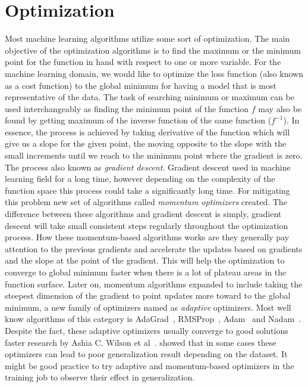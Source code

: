 \section{Optimization} \label{sec:optimization}
Most machine learning algorithms utilize some sort of optimization. 
The main objective of the optimization algorithms is to find the maximum or the minimum point for the function in hand with respect to one or more variable. 
For the machine learning domain, we would like to optimize the loss function (also known as a cost function) to the global minimum for having a model that is most representative of the data.
The task of searching minimum or maximum can be used interchangeably as finding the minimum point of the function $f$ may also be found by getting maximum of the inverse function of the same function ($f^{-1}$).
In essence, the process is achieved by taking derivative of the function which will give us a slope for the given point, the moving opposite to the slope with the small increments until we reach to the minimum point where the gradient is zero.
The process also known as \emph{gradient descent}.
Gradient descent used in machine learning field for a long time, however depending on the complexity of the function space this process could take a significantly long time. 
For mitigating this problem new set of algorithms called \emph{momentum optimizers} created.
The difference between these algorithms and gradient descent is simply, gradient descent will take small consistent steps regularly throughout the optimization process. 
How these momentum-based algorithms works are they generally pay attention to the previous gradients and accelerate the updates based on gradients and the slope at the point of the gradient. 
This will help the optimization to converge to global minimum faster when there is a lot of plateau areas in the function surface.
Later on, momentum algorithms expanded to include taking the steepest dimension of the gradient to point updates more toward to the global minimum, a new family of optimizers named as \emph{adaptive} optimizers. 
Most well know algorithms of this category is AdaGrad~\cite{adagrad}, RMSProp~\cite{rmsprop}, Adam~\cite{adam} and Nadam~\cite{nadam}.
Despite the fact, these adaptive optimizers usually converge to good solutions faster research by Ashia C. Wilson et al~\cite{optimize-ashia}. showed that in some cases these optimizers can lead to poor generalization result depending on the dataset.
It might be good practice to try adaptive and momentum-based optimizers in the training job to observe their effect in generalization.


